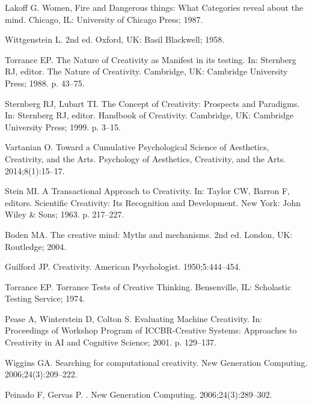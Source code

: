 \documentclass[10pt,letterpaper]{article}
\begin{document}
\begin{thebibliography}{10}
Lakoff G.
\newblock Women, Fire and Dangerous things: What Categories reveal about the
  mind.
\newblock Chicago, IL: University of Chicago Press; 1987.

Wittgenstein L.
\newblock 2nd ed. Oxford, UK: Basil Blackwell; 1958.

Torrance EP.
\newblock The Nature of Creativity as Manifest in its testing.
\newblock In: Sternberg RJ, editor. The Nature of Creativity. Cambridge, UK:
  Cambridge University Press; 1988. p. 43--75.

Sternberg RJ, Lubart TI.
\newblock The Concept of Creativity: Prospects and Paradigms.
\newblock In: Sternberg RJ, editor. Handbook of Creativity. Cambridge, UK:
  Cambridge University Press; 1999. p. 3--15.

Vartanian O.
\newblock Toward a Cumulative Psychological Science of Aesthetics, Creativity,
  and the Arts.
\newblock Psychology of Aesthetics, Creativity, and the Arts. 2014;8(1):15--17.

Stein MI.
\newblock A Transactional Approach to Creativity.
\newblock In: Taylor CW, Barron F, editors. Scientific Creativity: Its
  Recognition and Development. New York: John Wiley \& Sons; 1963. p. 217--227.

Boden MA.
\newblock The creative mind: Myths and mechanisms.
\newblock 2nd ed. London, UK: Routledge; 2004.

Guilford JP.
\newblock Creativity.
\newblock American Psychologist. 1950;5:444--454.

Torrance EP.
\newblock Torrance Tests of Creative Thinking.
\newblock Bensenville, IL: Scholastic Testing Service; 1974.

Pease A, Winterstein D, Colton S.
\newblock Evaluating Machine Creativity.
\newblock In: Proceedings of Workshop Program of ICCBR-Creative Systems:
  Approaches to Creativity in AI and Cognitive Science; 2001. p. 129--137.

Wiggins GA.
\newblock Searching for computational creativity.
\newblock New Generation Computing. 2006;24(3):209--222.

Peinado F, Gervas P.
.
\newblock New Generation Computing. {2006};{24}({3}):{289--302}.


\end{thebibliography}
\end{document}
